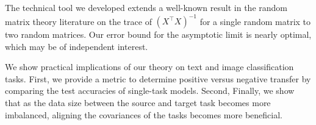 	The technical tool we developed extends a well-known result in the random matrix theory literature on the trace of $(X^{\top}X)^{-1}$ \cite{S07} for a single random matrix to two random matrices.
	Our error bound for the asymptotic limit is nearly optimal, which may be of independent interest.

We show practical implications of our theory on text and image classification tasks.
	First, we provide a metric to determine positive versus negative transfer by comparing the test accuracies of single-task models.
	Second, \todo{}
	Finally, we show that as the data size between the source and target task becomes more imbalanced, aligning the covariances of the tasks becomes more beneficial.




